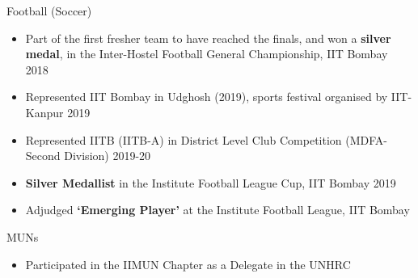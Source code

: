 

\begin{flushleft}
Football (Soccer)

\begin{itemize}
    \item Part of the first fresher team to have reached the finals, and won a \textbf{silver medal}, in the Inter-Hostel Football General Championship, IIT Bombay
            \hfill {\small 2018}
    \item Represented IIT Bombay in Udghosh (2019), sports festival organised by IIT-Kanpur		  
            \hfill {\small 2019}
    \item Represented IITB (IITB-A) in District Level Club Competition (MDFA-Second Division)
            \hfill {\small 2019-20}
    \item \textbf{Silver Medallist} in the Institute Football League Cup, IIT Bombay
            \hfill {\small 2019}
    \item Adjudged \textbf{‘Emerging Player’} at the Institute Football League, IIT Bombay
            \\
\end{itemize}

MUNs
\begin{itemize}
    \item Participated in the IIMUN Chapter as a Delegate in the UNHRC
            \\
\end{itemize}

\end{flushleft}